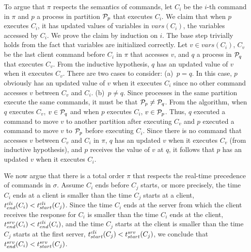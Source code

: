 To argue that $\pi$ respects the semantics of  commands, let $C_i$ be the $i$-th
command in $\pi$ and $p$ a process in partition $\mathcal{P}_p$ that executes $C_i$.
We claim that when $p$ executes $C_i$, it has updated values of variables in
$vars(C_i)$, the variables accessed by $C_i$. We prove the claim by induction on
$i$. The base step trivially holds from the fact that variables are initialized
correctly. Let $v \in vars(C_i)$, $C_v$ be the last client command before $C_i$
in $\pi$ that accesses $v$, and $q$ a process in $\mathcal{P}_q$ that executes $C_v$.
From the inductive hypothesis, $q$ has an updated value of $v$ when it executes
$C_v$. There are two cases to consider: (a)~$p = q$. In this case, $p$ obviously
has an updated value of $v$ when it executes $C_i$ since no other command
accesses $v$ between $C_v$ and $C_i$. (b)~$p \neq q$. Since processes in the
same partition execute the same commands, it must be that $\mathcal{P}_p \neq \mathcal{P}_q$.
From the algorithm, when $q$ executes $C_v$, $v \in \mathcal{P}_q$ and when $p$
executes $C_i$, $v \in \mathcal{P}_p$. Thus, $q$ executed a command to move $v$ to
another partition after executing $C_v$ and $p$ executed a command to move $v$
to $\mathcal{P}_p$ before executing $C_i$. Since there is no command that accesses $v$
between $C_v$ and $C_i$ in $\pi$, $q$ has an updated $v$ when it executes $C_v$
(from inductive hypothesis), and $p$ receives the value of $v$ at $q$, it
follows that $p$ has an updated $v$ when it executes $C_i$.

%
We now argue that there is a total order $\pi$ that respects the real-time
precedence of commands in $\sigma$. Assume $C_i$ ends before $C_j$ starts, or
more precisely, the time $C_i$ ends at a client is smaller than the time $C_j$
starts at a client, $t^{cli}_{end}(C_i) < t^{cli}_{start}(C_j)$. Since the time $C_i$ ends at the
server from which the client receives the response for $C_i$ is smaller than the
time $C_i$ ends at the client, $t^{srv}_{end}(C_i) < t^{cli}_{end}(C_i)$, and the time $C_j$
starts at the client is smaller than the time $C_j$ starts at the first server,
$t^{cli}_{start}(C_j) < t^{srv}_{start}(C_j)$, we conclude that $t^{srv}_{end}(C_i) < t^{srv}_{start}(C_j)$.

